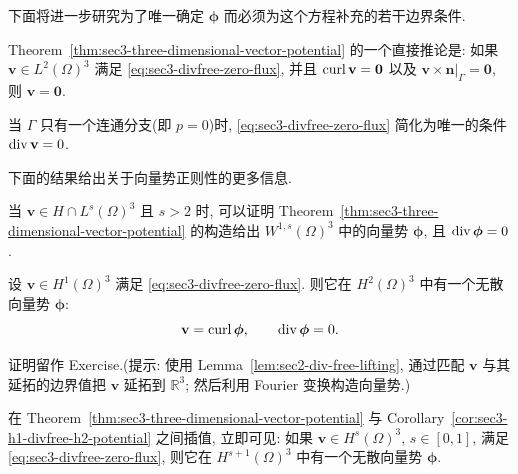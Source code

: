 
下面将进一步研究为了唯一确定 $\boldsymbol\phi$ 而必须为这个方程补充的若干边界条件.

\setcounter{statement}{8}
\begin{Remark}\label{rem:sec3-zero-curl-zero-tangential-implies-zero}
Theorem~\ref{thm:sec3-three-dimensional-vector-potential} 的一个直接推论是:
如果 $\mathbf v\in L^2(\Omega)^3$ 满足 \eqref{eq:sec3-divfree-zero-flux},
并且 $\operatorname{curl}\mathbf v=\mathbf0$ 以及
$\mathbf v\times\mathbf n|_\Gamma=\mathbf0$, 则 $\mathbf v=\mathbf0$.
\end{Remark}

\setcounter{statement}{9}
\begin{Remark}\label{rem:sec3-connected-boundary-divfree-condition}
当 $\Gamma$ 只有一个连通分支(即 $p=0$)时,
\eqref{eq:sec3-divfree-zero-flux} 简化为唯一的条件 $\operatorname{div}\mathbf v=0$.
\end{Remark}

下面的结果给出关于向量势正则性的更多信息.

\setcounter{statement}{10}
\begin{Remark}\label{rem:sec3-vector-potential-w1s}
当 $\mathbf v\in H\cap L^s(\Omega)^3$ 且 $s>2$ 时, 可以证明
Theorem~\ref{thm:sec3-three-dimensional-vector-potential} 的构造给出
$W^{1,s}(\Omega)^3$ 中的向量势 $\boldsymbol\phi$, 且
$\operatorname{div}\boldsymbol\phi=0$.
\end{Remark}

\setcounter{statement}{2}
\begin{Corollary}\label{cor:sec3-h1-divfree-h2-potential}
设 $\mathbf v\in H^1(\Omega)^3$ 满足 \eqref{eq:sec3-divfree-zero-flux}.
则它在 $H^2(\Omega)^3$ 中有一个无散向量势 $\boldsymbol\phi$:
\[
\mathbf v=\operatorname{curl}\boldsymbol\phi,
\qquad
\operatorname{div}\boldsymbol\phi=0.
\]
\end{Corollary}

证明留作 Exercise.(提示: 使用 Lemma~\ref{lem:sec2-div-free-lifting},
通过匹配 $\mathbf v$ 与其延拓的边界值把 $\mathbf v$ 延拓到 $\mathbb R^3$;
然后利用 Fourier 变换构造向量势.)

\setcounter{statement}{11}
\begin{Remark}\label{rem:sec3-fractional-potential-regularity}
在 Theorem~\ref{thm:sec3-three-dimensional-vector-potential} 与
Corollary~\ref{cor:sec3-h1-divfree-h2-potential} 之间插值, 立即可见:
如果 $\mathbf v\in H^s(\Omega)^3$, $s\in[0,1]$, 满足
\eqref{eq:sec3-divfree-zero-flux}, 则它在 $H^{s+1}(\Omega)^3$ 中有一个无散向量势
$\boldsymbol\phi$.
\end{Remark}


